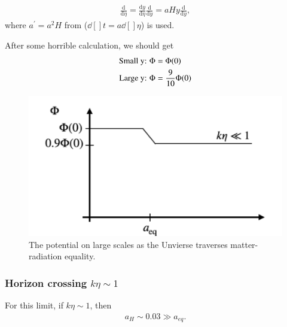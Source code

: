 \documentclass[a4paper, 12pt]{article}
\begin{document}
{{        \begin{align}
          \label{change of y derivative to conformal time}
          \frac{\mathrm{d}}{\mathrm{d}\eta} =
          \frac{\mathrm{d}y}{\mathrm{d}\eta}
          \frac{\mathrm{d}}{\mathrm{d}y} = a H y
          \frac{\mathrm{d}}{\mathrm{d}y}, 
        \end{align} where \( a^{\prime} = a^2 H  \) from (\(
        \dd[]{t} = a \dd[]{\eta}  \)) is used. 

        After some horrible calculation, we should get  
        \begin{align}
          \label{finnn}
          \textnormal{Small y: } \Phi &= \Phi(0) \\ 
          \textnormal{Large y: } \Phi &= \frac{9}{10} \Phi(0) 
        \end{align}

        \begin{figure}[h!]
        \begin{center}
          \includegraphics[scale=0.4]{Figures/finn.png}
        \end{center}
        \caption{The potential on large scales as the Unvierse
          traverses matter-radiation equality.}
        \label{fig:}
        \end{figure}
        
        \subsubsection{Horizon crossing $ k \eta \sim 1 $}%
          \label{sub:ketasim1}
          
          For this limit, if \( k \eta \sim 1  \), then 
          \begin{align}
            \label{horzing crossing = 1}
            a_{H} \sim 0.03 \gg a_{eq}.
          \end{align}

}}
\end{document}
